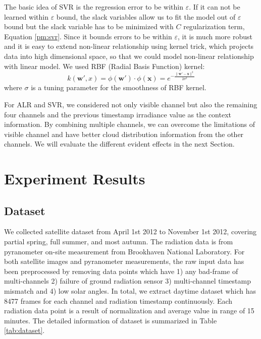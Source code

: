 \documentclass[conference]{IEEEtran}
\begin{document}
The basic idea of SVR is the regression error to be within $\varepsilon$. 
If it can not be learned within $\varepsilon$ bound, 
the slack variables allow us to fit the model out of $\varepsilon$ bound 
but the slack variable has to be minimized with $C$ regularization term, Equation \ref{pm:svr}.
Since it bounds errors to be within $\varepsilon$, it is much more robust and 
it is easy to extend non-linear relationship using kernel trick, which projects
data into high dimensional space, so that we could model non-linear relationship
with linear model\cite{smola2004tutorial}. We used RBF (Radial Basis Function) kernel:
\begin{equation}
k(\mathbf{w'},x)=\phi(\mathbf{w'}) \cdot \phi(\mathbf{x}) = e^{-\frac{\parallel \mathbf{w'-x} \parallel^2}{2\sigma^2}}
\label{rbfkernel}
\end{equation}
where $\sigma$ is a tuning parameter for the smoothness of RBF kernel.

For ALR and SVR, we considered not only visible channel but also the remaining
four channels and the previous timestamp irradiance value as the context information.
By combining multiple channels, we can overcome the limitations of visible channel and have better cloud distribution information from the other channels.
We will evaluate the different evident effects in the next Section.

 
\section{Experiment Results} %
\label{sec:result}

\subsection{Dataset}
\label{subsec:dataset}
We collected satellite dataset from April 1st 2012 to November 1st 2012, 
covering partial spring, full summer, and most autumn. The radiation data is
from pyranometer on-site measurement from Brookhaven National Laboratory.
For both satellite images and pyranometer measurements, the raw input
data has been preprocessed by removing data points which have 1) any bad-frame of multi-channels
2) failure of ground radiation sensor 3) multi-channel timestamp mismatch and 4) low
solar angles. In total, we extract daytime dataset which has 8477 frames for
each channel and radiation timestamp continuously. Each radiation data point is
a result of normalization and average value in range of 15 minutes. The detailed
information of dataset is summarized in Table \ref{tab:dataset}.
\end{document}
